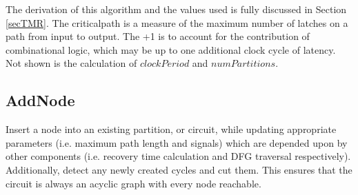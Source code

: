 \documentclass[12pt,final,oneside]{dwThesis} %
\begin{document}
   The derivation of this algorithm and the values used is fully discussed in Section \ref{secTMR}. The criticalpath is a measure of the maximum number of latches on a path from input to output. The +1 is to account for the contribution of combinational logic, which may be up to one additional clock cycle of latency.
   Not shown is the calculation of $clockPeriod$ and $numPartitions$.
   


   \newpage
   \subsection{AddNode}
   Insert a node into an existing partition, or circuit, while updating appropriate parameters (i.e. maximum path length and signals) which are depended upon by other components (i.e. recovery time calculation and \gls{DFG} traversal respectively).
   Additionally, detect any newly created cycles and cut them.
   This ensures that the circuit is always an acyclic graph with every node reachable.
\end{document}
